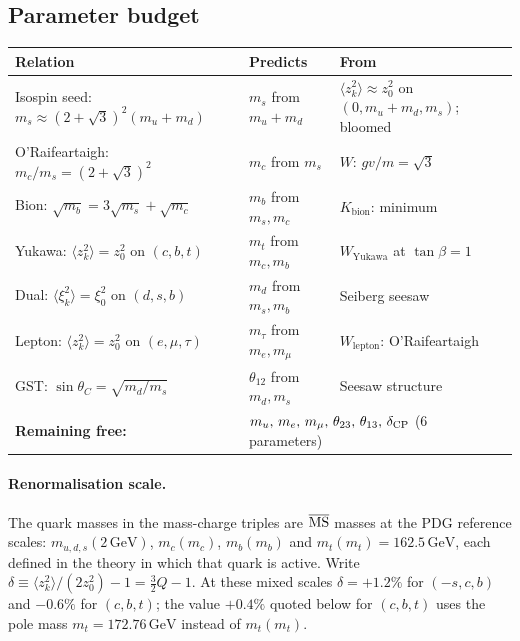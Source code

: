 \documentclass[12pt,a4paper]{article}
\newcommand{\GeV}{\,\text{GeV}}
\begin{document}
\subsection{Parameter budget}

\begin{center}
\small
\begin{tabular}{p{5cm}p{3.5cm}p{5.5cm}}
\toprule
Relation & Predicts & From \\
\midrule
Isospin seed: $m_s \approx (2{+}\sqrt{3})^2(m_u{+}m_d)$ & $m_s$ from $m_u{+}m_d$ & $\langle z_k^2\rangle \approx z_0^2$ on $(0,m_u{+}m_d,m_s)$; bloomed \\
O'Raifeartaigh: $m_c/m_s = (2{+}\sqrt{3})^2$ & $m_c$ from $m_s$ & $W$: $gv/m = \sqrt{3}$ \\
Bion: $\sqrt{m_b} = 3\sqrt{m_s} + \sqrt{m_c}$ & $m_b$ from $m_s, m_c$ & $K_{\text{bion}}$: minimum \\
Yukawa: $\langle z_k^2\rangle = z_0^2$ on $(c,b,t)$ & $m_t$ from $m_c, m_b$ & $W_{\text{Yukawa}}$ at $\tan\beta = 1$ \\
Dual: $\langle\xi_k^2\rangle = \xi_0^2$ on $(d,s,b)$ & $m_d$ from $m_s, m_b$ & Seiberg seesaw \\
Lepton: $\langle z_k^2\rangle = z_0^2$ on $(e,\mu,\tau)$ & $m_\tau$ from $m_e, m_\mu$ & $W_{\text{lepton}}$: O'Raifeartaigh \\
GST: $\sin\theta_C = \sqrt{m_d/m_s}$ & $\theta_{12}$ from $m_d, m_s$ & Seesaw structure \\
\midrule
\textbf{Remaining free:} & \multicolumn{2}{l}{$m_u,\, m_e,\, m_\mu,\, \theta_{23},\, \theta_{13},\, \delta_{\rm CP}$ (6 parameters)} \\
\bottomrule
\end{tabular}
\end{center}

\paragraph{Renormalisation scale.}
\label{par:renscale}
The quark masses in the mass-charge triples are $\overline{\rm MS}$
masses at the PDG reference scales: $m_{u,d,s}(2\GeV)$, $m_c(m_c)$,
$m_b(m_b)$ and $m_t(m_t) = 162.5\GeV$, each defined in the theory in
which that quark is active. Write
$\delta \equiv \langle z_k^2\rangle/(2z_0^2) - 1 = \tfrac32 Q - 1$.
At these mixed scales $\delta = +1.2\%$ for $(-s,c,b)$ and $-0.6\%$ for
$(c,b,t)$; the value $+0.4\%$ quoted below for $(c,b,t)$ uses the pole
mass $m_t = 172.76\GeV$ instead of $m_t(m_t)$.
\end{document}
